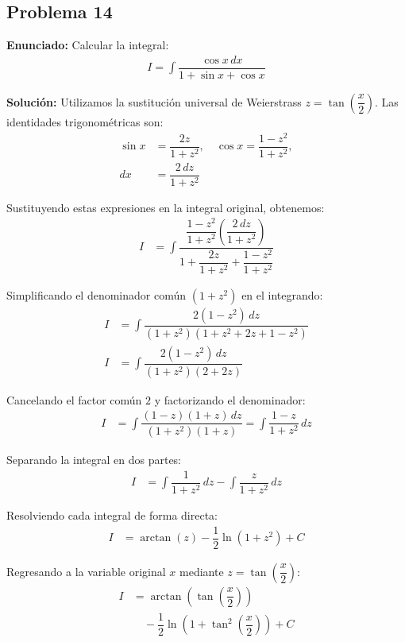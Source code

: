 \subsection*{Problema 14}

\textbf{Enunciado:} Calcular la integral:
\begin{align*}
I = \int \dfrac{\cos x \, dx}{1 + \sin x + \cos x}
\end{align*}

\textbf{Solución:} 
Utilizamos la sustitución universal de 
Weierstrass $z = \tan\left(\dfrac{x}{2}\right)$. 
Las identidades trigonométricas son:
\begin{align*}
\sin x &= \dfrac{2z}{1 + z^2}, \quad 
\cos x = \dfrac{1 - z^2}{1 + z^2}, \\
dx &= \dfrac{2 \, dz}{1 + z^2}
\end{align*}

Sustituyendo estas expresiones en la 
integral original, obtenemos:
\begin{align*}
I &= \int \dfrac{\dfrac{1 - z^2}{1 + z^2} 
\left(\dfrac{2 \, dz}{1 + z^2}\right)}
{1 + \dfrac{2z}{1 + z^2} + \dfrac{1 - z^2}{1 + z^2}}
\end{align*}

Simplificando el denominador común 
$(1 + z^2)$ en el integrando:
\begin{align*}
I &= \int \dfrac{2(1 - z^2) \, dz}
{(1 + z^2)(1 + z^2 + 2z + 1 - z^2)} \\
I &= \int \dfrac{2(1 - z^2) \, dz}
{(1 + z^2)(2 + 2z)}
\end{align*}

Cancelando el factor común $2$ y factorizando 
el denominador:
\begin{align*}
I &= \int \dfrac{(1 - z)(1 + z) \, dz}
{(1 + z^2)(1 + z)} = \int \dfrac{1 - z}{1 + z^2} \, dz
\end{align*}

Separando la integral en dos partes:
\begin{align*}
I &= \int \dfrac{1}{1 + z^2} \, dz - \int \dfrac{z}{1 + z^2} \, dz
\end{align*}

Resolviendo cada integral de forma directa:
\begin{align*}
I &= \arctan(z) - \dfrac{1}{2}\ln(1 + z^2) + C
\end{align*}

Regresando a la variable original $x$ 
mediante $z = \tan\left(\dfrac{x}{2}\right)$:
\begin{align*}
I &= \arctan\left(\tan\left(\dfrac{x}{2}\right)\right) \\
&\quad - \dfrac{1}{2}\ln\left(1 + \tan^2\left(\dfrac{x}{2}\right)\right) + C
\end{align*}

